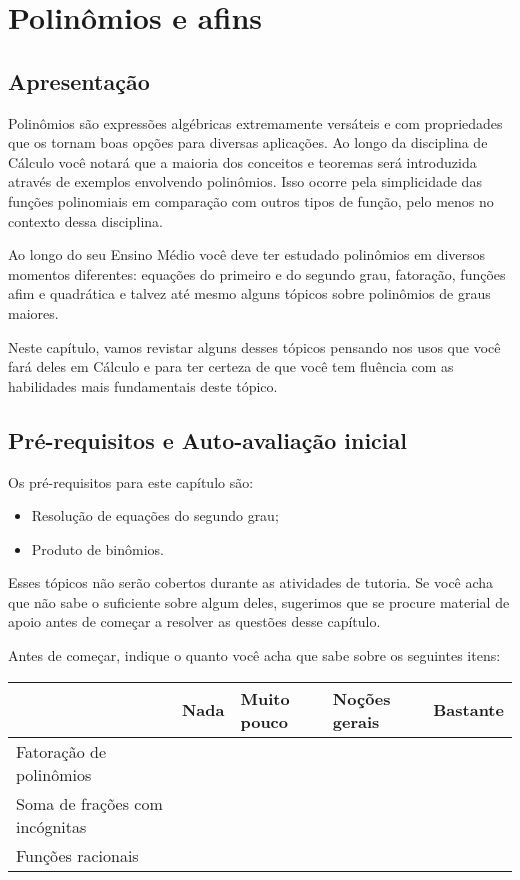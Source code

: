 \documentclass[main_estudante.tex]{subfiles}
\begin{document}
\chapter{Polinômios e afins}

\section{Apresentação}

Polinômios são expressões algébricas extremamente versáteis e com propriedades que os tornam boas opções para diversas aplicações. Ao longo da disciplina de Cálculo você notará que a maioria dos conceitos e teoremas será introduzida através de exemplos envolvendo polinômios. Isso ocorre pela simplicidade das funções polinomiais em comparação com outros tipos de função, pelo menos no contexto dessa disciplina.

Ao longo do seu Ensino Médio você deve ter estudado polinômios em diversos momentos diferentes: equações do primeiro e do segundo grau, fatoração, funções afim e quadrática e talvez até mesmo alguns tópicos sobre polinômios de graus maiores.

Neste capítulo, vamos revistar alguns desses tópicos pensando nos usos que você fará deles em Cálculo e para ter certeza de que você tem fluência com as habilidades mais fundamentais deste tópico.

\newpage

\section{Pré-requisitos e Auto-avaliação inicial}

Os pré-requisitos para este capítulo são:
\begin{itemize}
 \item Resolução de equações do segundo grau;
 \item Produto de binômios.
\end{itemize}

Esses tópicos não serão cobertos durante as atividades de tutoria. Se você acha que não sabe o suficiente sobre algum deles, sugerimos que se procure material de apoio antes de começar a resolver as questões desse capítulo.

\paraFolhaAvaliacoes

Antes de começar, indique o quanto você acha que sabe sobre os seguintes itens:

\begin{center}
 \begin{tabular}{|p{35mm}||p{15mm}|p{15mm}|p{15mm}|p{15mm}|} 
 \hline
   & Nada & Muito pouco & Noções gerais & Bastante\\
 \hline
 Fatoração de polinômios &  &  &  &  \\ 
 \hline
 Soma de frações com incógnitas &  &  &  &  \\
 \hline
 Funções racionais &  &  &  &  \\
 \hline
\end{tabular}
\end{center}
\end{document}
